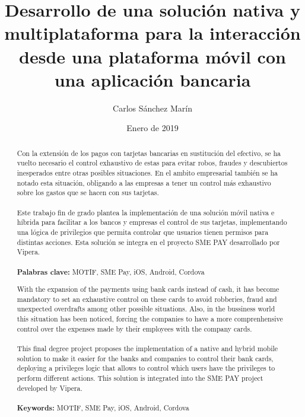\documentclass[a4paper, 12pt]{article}
\author{Carlos Sánchez Marín}
\date{Enero de 2019}
\title{Desarrollo de una solución nativa y multiplataforma para la interacción desde una plataforma móvil con una aplicación bancaria}
\begin{document}
\maketitle
\begin{export}
\null
\newpage

\tableofcontents
\newpage

\listoffigures
\listoflistings
\newpage
\end{export}

\begin{abstract}
\normalsize
Con la extensión de los pagos con tarjetas bancarias en sustitución del efectivo, se ha vuelto necesario el control exhaustivo de estas para evitar
robos, fraudes y descubiertos inesperados entre otras posibles situaciones. En el ambito empresarial también se ha notado esta situación, obligando a
las empresas a tener un control más exhaustivo sobre los gastos que se hacen con sus tarjetas.
\\
\\
Este trabajo fin de grado plantea la implementación de una solución móvil nativa e híbrida para facilitar a los bancos y empresas el control de sus tarjetas,
implementando una lógica de privilegios que permita controlar que usuarios tienen permisos para distintas acciones. Esta solución se integra en el proyecto SME PAY
desarrollado por Vipera.
\\
\\
\textbf{Palabras clave:} MOTIF, SME Pay, iOS, Android, Cordova
\end{abstract}
\break
\begin{otherlanguage}{english}
\begin{abstract}
\normalsize
With the expansion of the payments using bank cards instead of cash, it has become mandatory to set an exhaustive control on these cards to avoid robberies, fraud and unexpected
overdrafts among other possible situations. Also, in the bussiness world this situation has been noticed, forcing the companies to have a more comprenhensive control over the expenses made by
their employees with the company cards.
\\
\\
This final degree project proposes the implementation of a native and hybrid mobile solution to make it easier for the banks and companies to control their bank cards, deploying a privileges logic that allows to control which users have the privileges to perform different actions. This solution is integrated into the SME PAY project developed by Vipera.
\\
\\
\textbf{Keywords:} MOTIF, SME Pay, iOS, Android, Cordova
\end{abstract}
\end{otherlanguage}
\end{document}
